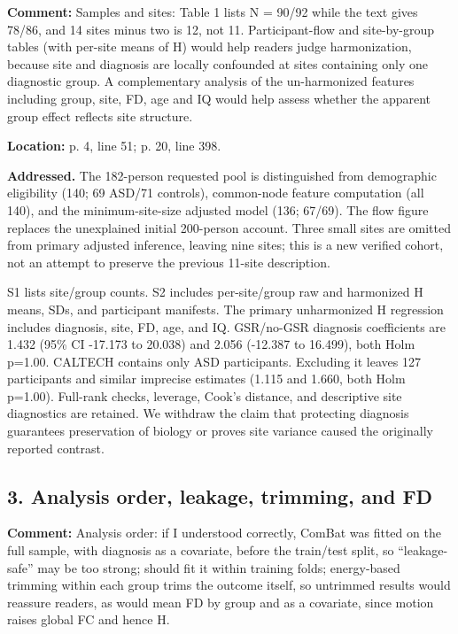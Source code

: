 \documentclass[11pt]{article}
\begin{document}
\textbf{Comment:} Samples and sites: Table 1 lists N = 90/92 while the text gives 78/86, and 14 sites minus two is 12, not 11. Participant-flow and site-by-group tables (with per-site means of H) would help readers judge harmonization, because site and diagnosis are locally confounded at sites containing only one diagnostic group. A complementary analysis of the un-harmonized features including group, site, FD, age and IQ would help assess whether the apparent group effect reflects site structure.


\textbf{Location:} p. 4, line 51; p. 20, line 398.


 \textbf{Addressed.} The 182-person requested pool is distinguished from demographic eligibility (140; 69 ASD/71 controls), common-node feature computation (all 140), and the minimum-site-size adjusted model (136; 67/69). The flow figure replaces the unexplained initial 200-person account. Three small sites are omitted from primary adjusted inference, leaving nine sites; this is a new verified cohort, not an attempt to preserve the previous 11-site description.


S1 lists site/group counts. S2 includes per-site/group raw and harmonized H means, SDs, and participant manifests. The primary unharmonized H regression includes diagnosis, site, FD, age, and IQ. GSR/no-GSR diagnosis coefficients are 1.432 (95\% CI -17.173 to 20.038) and 2.056 (-12.387 to 16.499), both Holm p=1.00. CALTECH contains only ASD participants. Excluding it leaves 127 participants and similar imprecise estimates (1.115 and 1.660, both Holm p=1.00). Full-rank checks, leverage, Cook's distance, and descriptive site diagnostics are retained. We withdraw the claim that protecting diagnosis guarantees preservation of biology or proves site variance caused the originally reported contrast.


\subsection*{3. Analysis order, leakage, trimming, and FD}

\textbf{Comment:} Analysis order: if I understood correctly, ComBat was fitted on the full sample, with diagnosis as a covariate, before the train/test split, so “leakage-safe” may be too strong; should fit it within training folds; energy-based trimming within each group trims the outcome itself, so untrimmed results would reassure readers, as would mean FD by group and as a covariate, since motion raises global FC and hence H.
\end{document}
